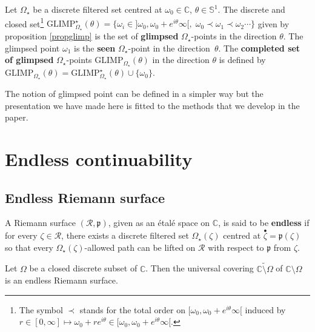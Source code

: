 \documentclass[11pt, english]{smfart}
\theoremstyle{definition}
\begin{document}
\begin{defi}\label{defseengl}
Let  $\Omega_\star$ be a discrete filtered set centred at
$\omega_0 \in \mathbb{C}$, $\theta \in \mathbb{S}^1$.  The discrete
and closed set\footnote{
The symbol $\prec$ stands for the total order on
$[\omega_0,
\omega_0+e^{i\theta}\infty[$ induced by $r \in [0,\infty] \mapsto
\omega_0 +re^{i\theta} \in [\omega_0,\omega_0+e^{i\theta}\infty[$. }
${\mathrm{GLIMP}_{\Omega_\star}^\star(\theta) = \{\omega_i \in ]\omega_0,
\omega_0+e^{i\theta}\infty[, \; \omega_0 \prec \omega_{1} \prec \omega_{2} \cdots \}}$
given by  proposition \ref{propglimp}
is the set of \textbf{glimpsed} $\Omega_\star$-points in the direction $\theta$. The
glimpsed point $\omega_1$  is the  \textbf{seen} $\Omega_\star$-point
in the direction~$\theta$. The \textbf{completed set of glimpsed}
$\Omega_\star$-points $\mathrm{GLIMP}_{\Omega_\star}(\theta)$ in the direction $\theta$ is defined by 
${\mathrm{GLIMP}_{\Omega_\star}(\theta) =
\mathrm{GLIMP}_{\Omega_\star}^\star(\theta) \cup \{\omega_0\}}$.
\end{defi}

\begin{rema}
The notion of glimpsed point can be defined in a
simpler way but the presentation we have made here is fitted
to the methods that we develop in the paper.
\end{rema}

\section{Endless continuability}\label{CNP-s-end}

\subsection{Endless Riemann surface}

\begin{defi}\label{endRS}
A Riemann surface $(\mathscr{R}, \mathfrak{p})$, given as an \'etal\'e space on
$\mathbb{C}$, is said to be \textbf{endless} if for every $\zeta \in
\mathscr{R}$,  there
exists a discrete filtered set $\Omega_\star(\zeta)$ centred at
${ {\stackrel{\bullet}{\zeta}} } = \mathfrak{p}(\zeta)$  so that 
every $\Omega_\star(\zeta)$-allowed path can be lifted
  on $\mathscr{R}$ with respect to $\mathfrak{p}$ from $\zeta$.
\end{defi}

\begin{exem}
Let  $\Omega$ be a closed discrete subset of
$\mathbb{C}$. Then the universal covering $\widetilde{\mathbb{C}\setminus \Omega}$
of $\mathbb{C}\setminus \Omega$ is an endless Riemann surface.
\end{exem}
\end{document}
